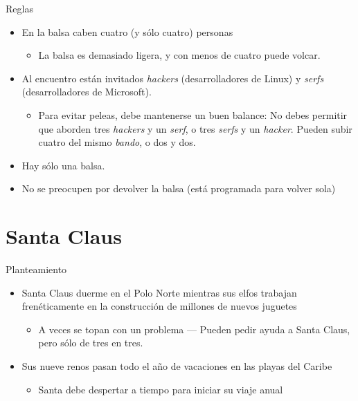 \documentclass[presentation]{beamer}
\begin{document}
\begin{frame}[label={sec:org29911b1}]{Reglas}
\begin{itemize}
\item En la balsa caben cuatro (y sólo cuatro) personas
\begin{itemize}
\item La balsa es demasiado ligera, y con menos de cuatro puede volcar.
\end{itemize}
\item Al encuentro están invitados \emph{hackers} (desarrolladores de Linux) y
\emph{serfs} (desarrolladores de Microsoft).
\begin{itemize}
\item Para evitar peleas, debe mantenerse un buen balance: No debes
permitir que aborden tres \emph{hackers} y un \emph{serf}, o tres \emph{serfs} y
un \emph{hacker}. Pueden subir cuatro del mismo \emph{bando}, o dos y dos.
\end{itemize}
\item Hay sólo una balsa.
\item No se preocupen por devolver la balsa (está programada para volver
sola)
\end{itemize}
\end{frame}

\section{Santa Claus}
\label{sec:orga931b56}
\begin{frame}[label={sec:org67da581}]{Planteamiento}
\begin{itemize}
\item Santa Claus duerme en el Polo Norte mientras sus elfos trabajan
frenéticamente en la construcción de millones de nuevos juguetes
\begin{itemize}
\item A veces se topan con un problema — Pueden pedir ayuda a Santa
Claus, pero sólo de tres en tres.
\end{itemize}
\item Sus nueve renos pasan todo el año de vacaciones en las playas del
Caribe
\begin{itemize}
\item Santa debe despertar a tiempo para iniciar su viaje anual
\end{itemize}
\end{itemize}
\end{frame}
\end{document}
